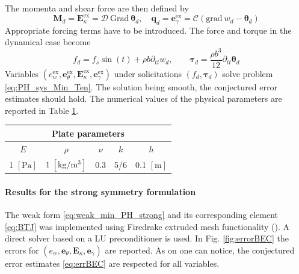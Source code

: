 \documentclass{ifacconf}
\begin{document}
The momenta and shear force are then defined by
\[
\bm{M}_d = \bm{E}_\kappa^\text{ex} =  \mathcal{D} \ \mathrm{Grad} \ \bm{\theta}_d, \quad \bm{q}_d = \bm{e}_\gamma^\text{ex} = \mathcal{C}(\mathrm{grad} \ w_d - \bm{\theta}_d)
\]
Appropriate forcing terms have to be introduced. The force and torque in the dynamical case become
\begin{equation*}
f_d = f_s \sin(t) + \rho b \partial_{tt} w_d, \qquad
\bm{\tau}_d = \frac{\rho b^3}{12} \partial_{tt} \bm{\theta}_d
\end{equation*}
Variables $(e_w^\text{ex}, \bm{e}_\theta^\text{ex}, \bm{E}_\kappa^\text{ex}, \bm{e}_\gamma^\text{ex})$ under solicitations $(f_d, \bm{\tau}_d)$ solve problem \eqref{eq:PH_sys_Min_Ten}. The solution being smooth, the conjectured error estimates should hold. The numerical values of the physical parameters are reported in Table \ref{tab:parMin}.

\begin{table}[h]
	\centering
	\begin{tabular}{ccccc}
		\hline 
		\multicolumn{5}{c}{Plate parameters} \\ 
		\hline 
		$E$ & $\rho$ & $\nu$ & $k$ & $h$ \\
		1 $[\textrm{Pa}]$ & $1\; [\textrm{kg}/\textrm{m}^3]$ & 0.3 & 5/6 & 0.1 $[\textrm{m}]$\\ 
		\hline 
	\end{tabular} 
	\captionsetup{width=0.95\linewidth}
	\vspace{1mm}
	\label{tab:parMin}
\end{table}

\paragraph{Results for the strong symmetry formulation} 

The weak form \eqref{eq:weak_min_PH_strong} and its corresponding element \eqref{eq:BTJ} was implemented using Firedrake extruded mesh functionality (\cite{firedrake_extruded}). A direct solver based on a LU preconditioner is used. In Fig. \ref{fig:errorBEC} the errors for $(e_w, \bm{e}_\theta, \bm{E}_\kappa, \bm{e}_\gamma)$ are reported. As on one can notice, the conjectured error estimates \eqref{eq:errBEC} are respected for all variables. 
\end{document}
